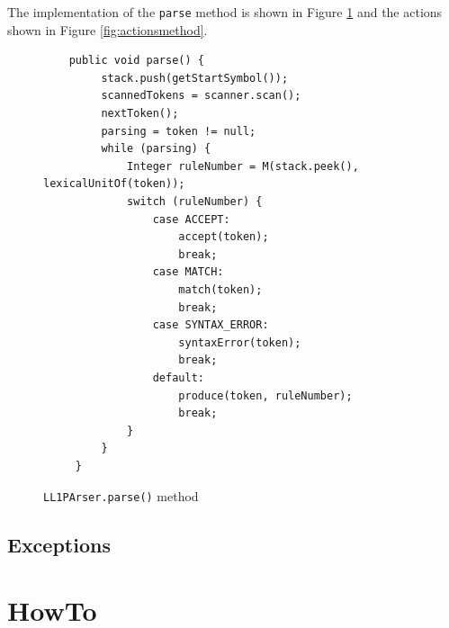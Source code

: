 \documentclass[letterpaper]{article}
\begin{document}
The implementation of the \texttt{parse}
method is shown in Figure \ref{fig:parsemethod} and the actions shown
in Figure \ref{fig:actionsmethod}.

\begin{figure}[H]
    \centering
    \begin{lstlisting}
    public void parse() {
         stack.push(getStartSymbol());
         scannedTokens = scanner.scan();
         nextToken();
         parsing = token != null;
         while (parsing) {
             Integer ruleNumber = M(stack.peek(), lexicalUnitOf(token));
             switch (ruleNumber) {
                 case ACCEPT:
                     accept(token);
                     break;
                 case MATCH:
                     match(token);
                     break;
                 case SYNTAX_ERROR:
                     syntaxError(token);
                     break;
                 default:
                     produce(token, ruleNumber);
                     break;
             }
         }
     }
    \end{lstlisting}
    \caption{\texttt{LL1PArser.parse()} method}
    \label{fig:parsemethod}
\end{figure}

\subsection{Exceptions}

\label{exceptionhandling}

\section{HowTo}

\label{howto}
\end{document}
